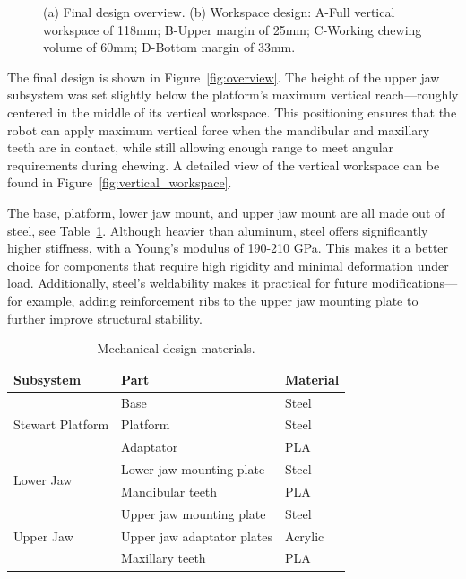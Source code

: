 \begin{figure}[H]
\begin{minipage}{.4\textwidth}
  \subcaption{}
  \label{fig:vertical_workspace}
\end{minipage}
\caption{(a) Final design overview. (b) Workspace design: A-Full vertical workspace of 118mm; B-Upper margin of 25mm; C-Working chewing volume of 60mm; D-Bottom margin of 33mm.}
\label{fig:mecha_design}
\end{figure}

The final design is shown in Figure~\ref{fig:overview}. The height of the upper jaw subsystem was set slightly below the platform's maximum 
vertical reach—roughly centered in the middle of its vertical workspace. This positioning ensures that the robot can apply maximum vertical 
force when the mandibular and maxillary teeth are in contact, while still allowing enough range to meet angular requirements during chewing. 
A detailed view of the vertical workspace can be found in Figure~\ref{fig:vertical_workspace}.

The base, platform, lower jaw mount, and upper jaw mount are all made out of steel, see Table~\ref{tab:mecha_materials}. Although heavier than aluminum, steel offers 
significantly higher stiffness, with a Young's modulus of 190-210 GPa. This makes it a better choice for components that require high 
rigidity and minimal deformation under load. Additionally, steel's weldability makes it practical for future modifications—for example, 
adding reinforcement ribs to the upper jaw mounting plate to further improve structural stability.


\begin{table}[H]
\centering
\begin{tabular}{@{}p{3.5cm} p{4.6cm} p{3cm}@{}}
\toprule
\textbf{Subsystem} & \textbf{Part} & \textbf{Material} \\
\midrule
\multirow{3}{*}{Stewart Platform} 
    & Base & Steel \\
    & Platform & Steel \\
    & Adaptator & PLA \\
\midrule
\multirow{2}{*}{Lower Jaw} 
    & Lower jaw mounting plate & Steel \\
    & Mandibular teeth & PLA \\
\midrule
\multirow{3}{*}{Upper Jaw} 
    & Upper jaw mounting plate & Steel \\
    & Upper jaw adaptator plates & Acrylic \\
    & Maxillary teeth & PLA \\
\bottomrule
\end{tabular}
\caption{Mechanical design materials.}
\label{tab:mecha_materials}
\end{table}

